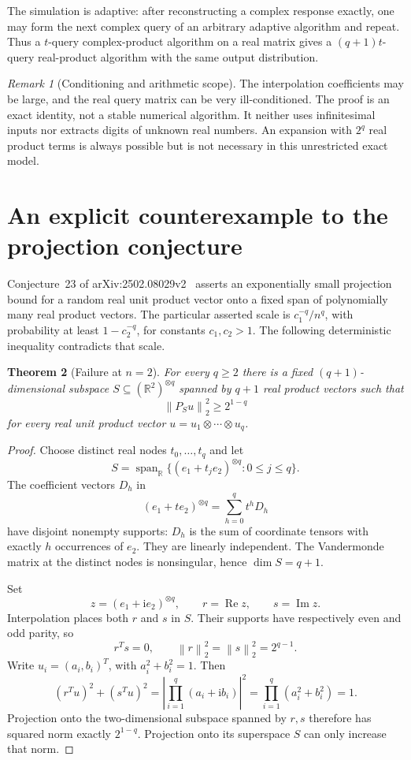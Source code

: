 \documentclass[11pt]{article}
\newtheorem{theorem}{Theorem}[section]
\theoremstyle{definition}\newtheorem{definition}[theorem]{Definition}
\theoremstyle{remark}\newtheorem{remark}[theorem]{Remark}
\newcommand{\R}{\mathbb R}\newcommand{\C}{\mathbb C}
\newcommand{\norm}[1]{\left\lVert#1\right\rVert}
\begin{document}
The simulation is adaptive: after reconstructing a complex response exactly,
one may form the next complex query of an arbitrary adaptive algorithm and
repeat. Thus a $t$-query complex-product algorithm on a real matrix gives a
$(q+1)t$-query real-product algorithm with the same output distribution.

\begin{remark}[Conditioning and arithmetic scope]
The interpolation coefficients may be large, and the real query matrix can be
very ill-conditioned. The proof is an exact identity, not a stable numerical
algorithm. It neither uses infinitesimal inputs nor extracts digits of unknown
real numbers. An expansion with $2^q$ real product terms is always possible but
is not necessary in this unrestricted exact model.
\end{remark}

\section{An explicit counterexample to the projection conjecture}
\label{sec:counterexample}

Conjecture~23 of arXiv:2502.08029v2~\cite{msw} asserts an exponentially small
projection bound for a random real unit product vector onto a fixed span of
polynomially many real product vectors. The particular asserted scale is
$c_1^{-q}/n^q$, with probability at least $1-c_2^{-q}$, for constants
$c_1,c_2>1$. The following deterministic inequality contradicts that scale.

\begin{theorem}[Failure at $n=2$]\label{thm:counterexample}
For every $q\ge2$ there is a fixed $(q+1)$-dimensional subspace
$S\subseteq(\R^2)^{\otimes q}$ spanned by $q+1$ real product vectors such that
\begin{equation}\label{eq:projectionlower}
 \norm{P_Su}_2^2\ge 2^{1-q}
\end{equation}
for every real unit product vector $u=u_1\otimes\cdots\otimes u_q$.
\end{theorem}
\begin{proof}
Choose distinct real nodes $t_0,\ldots,t_q$ and let
\[
 S=\operatorname{span}_{\R}\{(e_1+t_j e_2)^{\otimes q}:0\le j\le q\}.
\]
The coefficient vectors $D_h$ in
\[
 (e_1+t e_2)^{\otimes q}=\sum_{h=0}^q t^h D_h
\]
have disjoint nonempty supports: $D_h$ is the sum of coordinate tensors with
exactly $h$ occurrences of $e_2$. They are linearly independent. The Vandermonde
matrix at the distinct nodes is nonsingular, hence $\dim S=q+1$.

Set
\[
 z=(e_1+\mathrm{i}e_2)^{\otimes q},\qquad r=\operatorname{Re}z,
       \qquad s=\operatorname{Im}z.
\]
Interpolation places both $r$ and $s$ in $S$. Their supports have respectively
even and odd parity, so
\[
 r^Ts=0,\qquad \norm r_2^2=\norm s_2^2=2^{q-1}.
\]
Write $u_i=(a_i,b_i)^T$, with $a_i^2+b_i^2=1$. Then
\[
 (r^Tu)^2+(s^Tu)^2
   =\left|\prod_{i=1}^q(a_i+\mathrm{i}b_i)\right|^2
   =\prod_{i=1}^q(a_i^2+b_i^2)=1.
\]
Projection onto the two-dimensional subspace spanned by $r,s$ therefore has
squared norm exactly $2^{1-q}$. Projection onto its superspace $S$ can only
increase that norm.
\end{proof}
\end{document}
